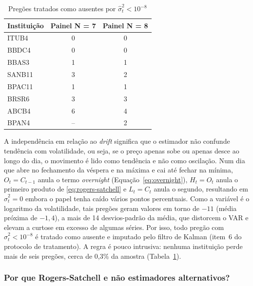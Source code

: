 \documentclass[12pt, a4paper, oneside, english, brazil]{abntex2}
\begin{document}
\begin{table}[!htbp]
\centering
\caption{Pregões tratados como ausentes por $\hat{\sigma}^2_t < 10^{-8}$}
\label{tab:variancia-nula}
\begin{tabular}{lcc}
\toprule
Instituição & Painel N = 7 & Painel N = 8 \\
\midrule
ITUB4  & 0 & 0 \\
BBDC4  & 0 & 0 \\
BBAS3  & 1 & 1 \\
SANB11 & 3 & 2 \\
BPAC11 & 1 & 1 \\
BRSR6  & 3 & 3 \\
ABCB4  & 6 & 4 \\
BPAN4  & -- & 2 \\
\bottomrule
\end{tabular}
\end{table}

A independência em relação ao \textit{drift} significa que o estimador não
confunde tendência com volatilidade, ou seja, se o preço apenas sobe ou apenas desce
ao longo do dia, o movimento é lido como tendência e não como oscilação.  
Num dia que abre no fechamento da véspera e na máxima
e cai até fechar na mínima, $O_t = C_{t-1}$ anula o termo \textit{overnight}
(Equação~\ref{eq:overnight}), $H_t = O_t$ anula o primeiro produto de
\eqref{eq:rogers-satchell} e $L_t = C_t$ anula o segundo, resultando em
$\hat{\sigma}^2_t = 0$ embora o papel tenha caído vários pontos percentuais.
Como a variável é o logaritmo da volatilidade, tais
pregões geram valores em torno de $-11$ (média próxima de $-1{,}4$), a mais
de 14 desvios-padrão da média, que distorcem o VAR e elevam a curtose em
excesso de algumas séries. Por isso, todo pregão com
$\hat{\sigma}^2_t < 10^{-8}$ é tratado como ausente e imputado pelo filtro de
Kalman (item~6 do protocolo de tratamento). A regra é pouco intrusiva:
nenhuma instituição perde mais de seis pregões, cerca de 0,3\% da amostra
(Tabela~\ref{tab:variancia-nula}).



\subsubsection*{Por que Rogers-Satchell e não estimadores alternativos?}
\end{document}
